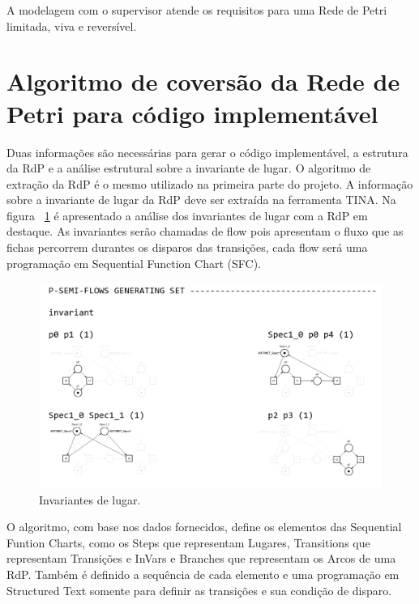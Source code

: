 A modelagem com o supervisor atende os requisitos para uma Rede de Petri limitada, viva e revers\'ivel.

\section{Algoritmo de covers\~ao da Rede de Petri para c\'odigo implement\'avel}

Duas informa\c{c}\~oes s\~ao necess\'arias para gerar o c\'odigo implement\'avel, a estrutura da RdP e a an\'alise estrutural sobre a invariante de lugar. O algoritmo de extra\c{c}\~ao da RdP \'e o mesmo utilizado na primeira parte do projeto. A informa\c{c}\~ao sobre a invariante de lugar da RdP deve ser extra\'ida na ferramenta TINA. Na figura ~\ref{fig:pqnafabstruct} \'e apresentado a an\'alise dos invariantes de lugar com a RdP em destaque. As invariantes ser\~ao chamadas de flow pois apresentam o fluxo que as fichas percorrem durantes os disparos das transi\c{c}\~oes, cada flow ser\'a uma programa\c{c}\~ao em Sequential Function Chart (SFC).

\begin{figure}[!htb]
	\caption[Invariantes de lugar.]{Invariantes de lugar.}
	\label{fig:pqnafabstruct}
	\includegraphics[width=16cm]{./figuras/PQNAFABSTRUCT.png}\centering
\end{figure}

O algoritmo, com base nos dados fornecidos, define os elementos das Sequential Funtion Charts, como os Steps que representam Lugares, Transitions que representam Transi\c{c}\~oes e InVars e Branches que representam os Arcos de uma RdP. Tamb\'em \'e definido a sequ\^encia de cada elemento e uma programa\c{c}\~ao em Structured Text somente para definir as transi\c{c}\~oes e sua condi\c{c}\~ao de disparo.


